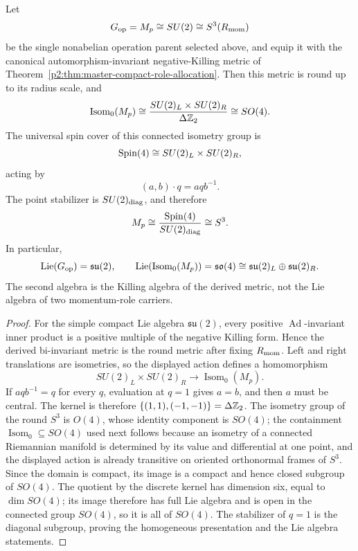 \documentclass[12pt,a4paper]{article}
\begin{document}
\begin{theorem}
\label{p2:thm:single-su2-derived-spin4-isometries}
Let
\[
 G_{\rm op}=M_p\cong SU(2)\cong S^3(R_{\mathrm{mom}})
\]
be the single nonabelian operation parent selected above, and equip it with
the canonical automorphism-invariant negative-Killing metric of
Theorem~\ref{p2:thm:master-compact-role-allocation}.  Then
this metric is round up to its radius scale, and
\[
 \operatorname{Isom}_0(M_p)
 \cong
 \frac{SU(2)_L\times SU(2)_R}{\Delta\mathbb{Z}_2}
 \cong SO(4).
\]
The universal spin cover of this connected isometry group is
\[
 \mathrm{Spin}(4)\cong SU(2)_L\times SU(2)_R,
\]
acting by
\[
 (a,b)\cdot q=a q b^{-1}.
\]
The point stabilizer is \(SU(2)_{\rm diag}\), and therefore
\[
 M_p\cong
 \frac{\mathrm{Spin}(4)}{SU(2)_{\rm diag}}
 \cong S^3.
\]
In particular,
\[
 \operatorname{Lie}(G_{\rm op})=\mathfrak{su}(2),
 \qquad
 \operatorname{Lie}(\operatorname{Isom}_0(M_p))
 =\mathfrak{so}(4)
 \cong\mathfrak{su}(2)_L\oplus\mathfrak{su}(2)_R.
\]
The second algebra is the Killing algebra of the derived metric, not the Lie
algebra of two momentum-role carriers.
\end{theorem}

\begin{proof}
For the simple compact Lie algebra \(\mathfrak{su}(2)\), every positive
\(\operatorname{Ad}\)-invariant inner product is a positive multiple of the
negative Killing form.  Hence the derived bi-invariant metric is the round
metric after fixing \(R_{\mathrm{mom}}\).  Left and right translations are isometries,
so the displayed action defines a homomorphism
\[
 SU(2)_L\times SU(2)_R\longrightarrow\operatorname{Isom}_0(M_p).
\]
If \(a q b^{-1}=q\) for every \(q\), evaluation at \(q=1\) gives \(a=b\),
and then \(a\) must be central.  The kernel is therefore
\(\{(1,1),(-1,-1)\}=\Delta\mathbb{Z}_2\).  The isometry group of the round \(S^3\)
is \(O(4)\), whose identity component is \(SO(4)\); the containment
\(\operatorname{Isom}_0\subseteq SO(4)\) used next follows because an isometry
of a connected Riemannian manifold is determined by its value and differential
at one point, and the displayed action is already transitive on oriented
orthonormal frames of \(S^3\).  Since the domain is compact, its image is
a compact and hence closed subgroup of \(SO(4)\).  The quotient by the discrete kernel has dimension six, equal to
\(\dim SO(4)\); its image therefore has full Lie algebra and is open in the
connected group \(SO(4)\), so it is all of \(SO(4)\).  The stabilizer of
\(q=1\) is the diagonal subgroup, proving the homogeneous presentation and
the Lie algebra statements.
\end{proof}
\end{document}
